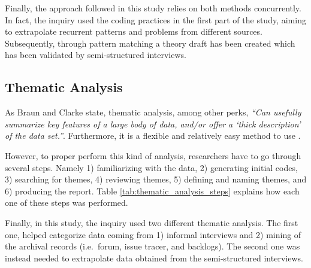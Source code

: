 Finally, the approach followed in this study relies on both methods concurrently. In fact, the inquiry used the coding practices in the first part of the study, aiming to extrapolate recurrent patterns and problems from different sources. Subsequently, through pattern matching a theory draft has been created which has been validated by semi-structured interviews.

\subsection{Thematic Analysis}
As Braun and Clarke \cite{thematic_analysis} state, thematic analysis, among other perks, \textit{``Can usefully summarize key features of a large body of data, and/or offer a ‘thick description’ of the data set.''}. Furthermore, it is a flexible and relatively easy method to use \cite{thematic_analysis}.

However, to proper perform this kind of analysis, researchers have to go through several steps. Namely 1) familiarizing with the data, 2) generating initial codes, 3) searching for themes, 4) reviewing themes, 5) defining and naming themes, and 6) producing the report. Table \ref{tab:thematic_analysis_steps} explains how each one of these steps was performed.

Finally, in this study, the inquiry used two different thematic analysis. The first one, helped categorize data coming from 1) informal interviews and 2) mining of the archival records (i.e.\ forum, issue tracer, and backlogs). The second one was instead needed to extrapolate data obtained from the semi-structured interviews.


